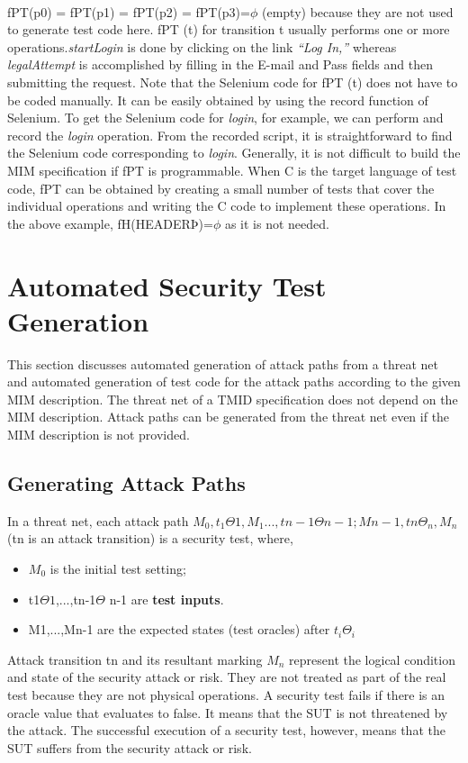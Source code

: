 \paragraph{}
fPT(p0) = fPT(p1) = fPT(p2) = fPT(p3)=$\phi$ (empty) because they are not used to generate test code here. fPT (t) for transition t usually performs one or more operations.\textit{startLogin} is done by clicking on the link \textit{“Log In,”} whereas \textit{legalAttempt} is accomplished by filling in the E-mail and Pass fields and then submitting the request. Note that the Selenium code for fPT (t) does not have to be coded manually. It can be easily obtained by using the record function of Selenium. To get the Selenium code for \textit{login}, for example, we can perform and record the \textit{login} operation. From the recorded script, it is straightforward to find the Selenium code corresponding to \textit{login}. Generally, it is not difficult to build the MIM specification if fPT is programmable. When C is the target language of test code, fPT can be obtained by creating a small number of tests that cover the individual operations and writing the C code to implement these operations. In the above example, fH(HEADERÞ)=$\phi$ as it is not needed.
\newpage
\section{\textbf{\Large Automated Security Test Generation}}

This section discusses automated generation of attack paths
from a threat net and automated generation of test code for
the attack paths according to the given MIM description. The
threat net of a TMID specification does not depend on the
MIM description. Attack paths can be generated from the
threat net even if the MIM description is not provided.
\subsection{\large Generating Attack Paths}
In a threat net, each attack path $M_0,t_1\Theta1, M_1...,tn-1\Theta n-1;
Mn-1,tn\Theta_n,M_n$(tn is an attack transition) is a security test,
where,
\begin{itemize}
\item $M_0$ is the initial test setting;
\item t1$\Theta1$,...,tn-1$\Theta$ n-1 are \textbf{test inputs}.
\item M1,...,Mn-1 are the expected states (test oracles) after $t_i\Theta_i$
\end{itemize}
Attack transition tn and its resultant marking $M_n$ represent
the logical condition and state of the security attack or risk.
They are not treated as part of the real test because they are
not physical operations. A security test fails if there is an
oracle value that evaluates to false. It means that the SUT is
not threatened by the attack. The successful execution of a
security test, however, means that the SUT suffers from the
security attack or risk.
